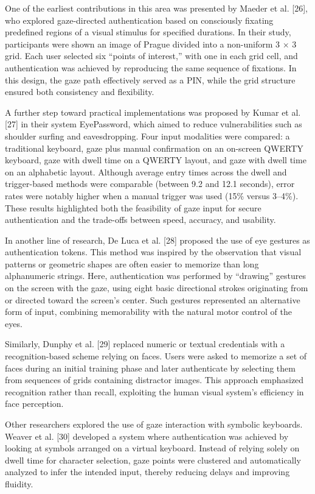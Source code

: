 \documentclass[12pt]{report}
\begin{document}
One of the earliest contributions in this area was presented by Maeder et al. [26], who explored gaze-directed authentication based on consciously fixating predefined regions of a visual stimulus for specified durations.
In their study, participants were shown an image of Prague divided into a non-uniform 3 × 3 grid.
Each user selected six “points of interest,” with one in each grid cell, and authentication was achieved by reproducing the same sequence of fixations.
In this design, the gaze path effectively served as a PIN, while the grid structure ensured both consistency and flexibility.

A further step toward practical implementations was proposed by Kumar et al. [27] in their system EyePassword, which aimed to reduce vulnerabilities such as shoulder surfing and eavesdropping. 
Four input modalities were compared: a traditional keyboard, gaze plus manual confirmation on an on-screen QWERTY keyboard, gaze with dwell time on a QWERTY layout, and gaze with dwell time on an alphabetic layout.
Although average entry times across the dwell and trigger-based methods were comparable (between 9.2 and 12.1 seconds), error rates were notably higher when a manual trigger was used (15\% versus 3–4\%).
These results highlighted both the feasibility of gaze input for secure authentication and the trade-offs between speed, accuracy, and usability.

In another line of research, De Luca et al. [28] proposed the use of eye gestures as authentication tokens. 
This method was inspired by the observation that visual patterns or geometric shapes are often easier to memorize than long alphanumeric strings. 
Here, authentication was performed by “drawing” gestures on the screen with the gaze, using eight basic directional strokes originating from or directed toward the screen's center. 
Such gestures represented an alternative form of input, combining memorability with the natural motor control of the eyes.

Similarly, Dunphy et al. [29] replaced numeric or textual credentials with a recognition-based scheme relying on faces. 
Users were asked to memorize a set of faces during an initial training phase and later authenticate by selecting them from sequences of grids containing distractor images. This approach emphasized recognition rather than recall, exploiting the human visual system's efficiency in face perception.

Other researchers explored the use of gaze interaction with symbolic keyboards. 
Weaver et al. [30] developed a system where authentication was achieved by looking at symbols arranged on a virtual keyboard.
Instead of relying solely on dwell time for character selection, gaze points were clustered and automatically analyzed to infer the intended input, thereby reducing delays and improving fluidity.
\end{document}
